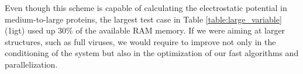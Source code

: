 Even though this scheme is capable of calculating the electrostatic potential in medium-to-large proteins, the largest test case in Table \ref{table:large_variable} (1igt) used up 30\% of the available RAM memory. 
If we were aiming at larger structures, such as full viruses,\cite{MartinezETal2019,wang2021high} we would require to improve not only in the conditioning of the system but also in the optimization of our fast algorithms\cite{wang2021exafmm,kailasa2023pyexafmm} and parallelization.

\begin{table}
\centering
{}
\caption{Results for larger structures with a variable permittivity.}
\label{table:large_variable}
\end{table}

